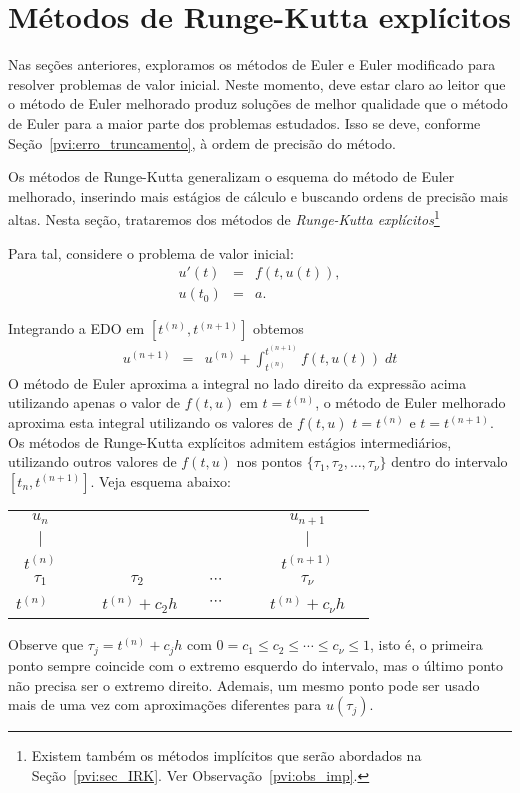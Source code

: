 \section{Métodos de Runge-Kutta explícitos}\label{pvi:sec_RK}
Nas seções anteriores, exploramos os métodos de Euler e Euler modificado para resolver problemas de valor inicial. Neste momento, deve estar claro ao leitor que o método de Euler melhorado produz soluções de melhor qualidade que o método de Euler para a maior parte dos problemas estudados. Isso se deve, conforme Seção~\ref{pvi:erro_truncamento}, à ordem de precisão do método. 

Os métodos de Runge-Kutta generalizam o esquema do método de Euler melhorado, inserindo mais estágios de cálculo e buscando ordens de precisão mais altas. Nesta seção, trataremos dos métodos de \emph{Runge-Kutta explícitos}\footnote{Existem também os métodos implícitos que serão abordados na Seção~\ref{pvi:sec_IRK}. Ver Observação~\ref{pvi:obs_imp}.}

Para tal, considere o  problema de valor inicial:
\begin{eqnarray}
  u'(t) &=&f(t,u(t)), \\
  u(t_0) &=&a.
\end{eqnarray}

Integrando a EDO em $[t^{(n)},t^{(n+1)}]$ obtemos
\begin{eqnarray}
  u^{(n+1)}  &=&u^{(n)}  + \int _{t^{(n)}}^{t^{(n+1)}} f(t,u(t)) \; dt
\end{eqnarray}
O método de Euler aproxima a integral no lado direito da expressão acima utilizando apenas o valor de $f(t,u)$ em $t=t^{(n)}$, o método de Euler melhorado aproxima esta integral utilizando os valores de $f(t,u)$ $t=t^{(n)}$ e $t=t^{(n+1)}$. Os métodos de Runge-Kutta explícitos admitem estágios intermediários, utilizando outros valores de $f(t,u)$ nos pontos $\{\tau_1,\tau_2,\ldots,\tau_\nu\}$ dentro do intervalo $[t_n,t^{(n+1)}]$. Veja esquema abaixo:
\begin{center}
\begin{tabular}{c c c c c}
  $u_n$ &      &       &      & $u_{n+1}$ \\
  $|$   &      &       &      &  $|$  \\ \hline
  $t^{(n)}$ &      &       &      & $t^{(n+1)}$ \\
  $\tau _1$  & $\tau _2$ & $\cdots $ &      & $\tau_\nu $\\
  $t^{(n)}$~~  &~~ $t^{(n)}+c_2h$~~ & $\cdots $ &      & ~~$t^{(n)}+c_\nu h $~~
  \end{tabular}
\end{center}
Observe que $\tau_j=t^{(n)}+c_jh$ com $0=c_1 \leq c_2 \leq \cdots \leq c_\nu \leq 1$, isto é, o primeira ponto sempre coincide com o extremo esquerdo do intervalo, mas o último ponto não precisa ser o extremo direito. Ademais, um mesmo ponto pode ser usado mais de uma vez com aproximações diferentes para $u(\tau_j)$.

